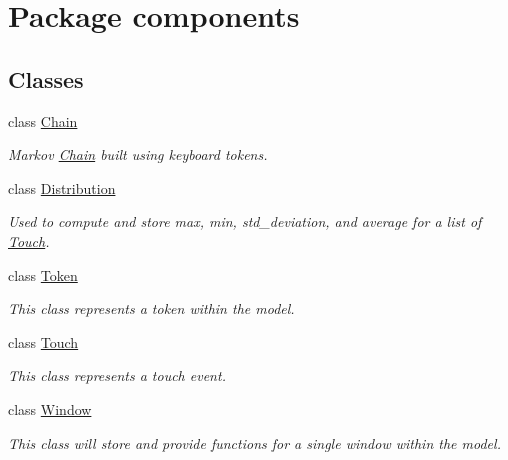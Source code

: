 \hypertarget{namespacecomponents}{}\section{Package components}
\label{namespacecomponents}
\subsection*{Classes}
\begin{DoxyCompactItemize}
\item 
class \hyperlink{classcomponents_1_1_chain}{Chain}
\begin{DoxyCompactList}\small\item\em Markov \hyperlink{classcomponents_1_1_chain}{Chain} built using keyboard tokens. \end{DoxyCompactList}\item 
class \hyperlink{classcomponents_1_1_distribution}{Distribution}
\begin{DoxyCompactList}\small\item\em Used to compute and store max, min, std\+\_\+deviation, and average for a list of \hyperlink{classcomponents_1_1_touch}{Touch}. \end{DoxyCompactList}\item 
class \hyperlink{classcomponents_1_1_token}{Token}
\begin{DoxyCompactList}\small\item\em This class represents a token within the model. \end{DoxyCompactList}\item 
class \hyperlink{classcomponents_1_1_touch}{Touch}
\begin{DoxyCompactList}\small\item\em This class represents a touch event. \end{DoxyCompactList}\item 
class \hyperlink{classcomponents_1_1_window}{Window}
\begin{DoxyCompactList}\small\item\em This class will store and provide functions for a single window within the model. \end{DoxyCompactList}\end{DoxyCompactItemize}
